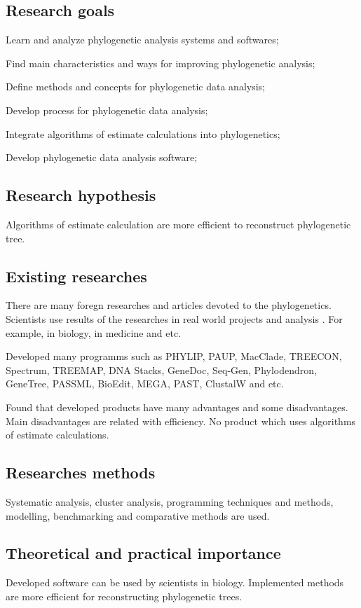 \subsection*{Research goals} 

Learn and analyze phylogenetic analysis systems and softwares;

Find main characteristics and ways for improving phylogenetic analysis;

Define methods and concepts for phylogenetic data analysis;

Develop process for phylogenetic data analysis;

Integrate algorithms of estimate calculations into phylogenetics;	

Develop phylogenetic data analysis software; 

\subsection*{Research hypothesis}
Algorithms of estimate calculation are more efficient to 
reconstruct phylogenetic tree.

\subsection*{Existing researches}
There are many foregn researches and articles 
devoted to the phylogenetics.
Scientists use results of the researches in real 
world projects and analysis . For example, in biology, 
in medicine and etc.

Developed many programms such as PHYLIP, PAUP, MacClade, 
TREECON, Spectrum, TREEMAP, DNA Stacks, GeneDoc, Seq-Gen, 
Phylodendron, GeneTree, PASSML, BioEdit, MEGA, PAST, ClustalW and etc.

Found that developed products have many advantages and some 
disadvantages. Main disadvantages are related with efficiency. 
No product which uses algorithms of estimate calculations.

\subsection*{Researches methods}
Systematic analysis, cluster analysis, programming techniques and 
methods, modelling, benchmarking and comparative methods are used.

\subsection*{Theoretical and practical importance}
Developed software can be used by scientists in biology.
Implemented methods are more efficient for reconstructing
phylogenetic trees.


